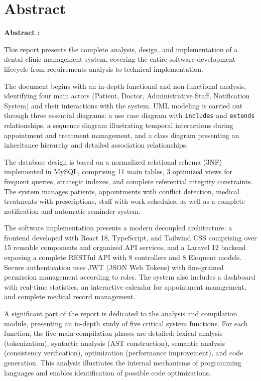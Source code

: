 \documentclass[12pt,a4paper]{report}
\begin{document}
\chapter*{Abstract}
\thispagestyle{empty}

\textbf{Abstract :}

This report presents the complete analysis, design, and implementation of a dental clinic management system, covering the entire software development lifecycle from requirements analysis to technical implementation.

The document begins with an in-depth functional and non-functional analysis, identifying four main actors (Patient, Doctor, Administrative Staff, Notification System) and their interactions with the system. UML modeling is carried out through three essential diagrams: a use case diagram with \texttt{includes} and \texttt{extends} relationships, a sequence diagram illustrating temporal interactions during appointment and treatment management, and a class diagram presenting an inheritance hierarchy and detailed association relationships.

The database design is based on a normalized relational schema (3NF) implemented in MySQL, comprising 11 main tables, 3 optimized views for frequent queries, strategic indexes, and complete referential integrity constraints. The system manages patients, appointments with conflict detection, medical treatments with prescriptions, staff with work schedules, as well as a complete notification and automatic reminder system.

The software implementation presents a modern decoupled architecture: a frontend developed with React 18, TypeScript, and Tailwind CSS comprising over 15 reusable components and organized API services, and a Laravel 12 backend exposing a complete RESTful API with 8 controllers and 8 Eloquent models. Secure authentication uses JWT (JSON Web Tokens) with fine-grained permission management according to roles. The system also includes a dashboard with real-time statistics, an interactive calendar for appointment management, and complete medical record management.

A significant part of the report is dedicated to the analysis and compilation module, presenting an in-depth study of five critical system functions. For each function, the five main compilation phases are detailed: lexical analysis (tokenization), syntactic analysis (AST construction), semantic analysis (consistency verification), optimization (performance improvement), and code generation. This analysis illustrates the internal mechanisms of programming languages and enables identification of possible code optimizations.
\end{document}
